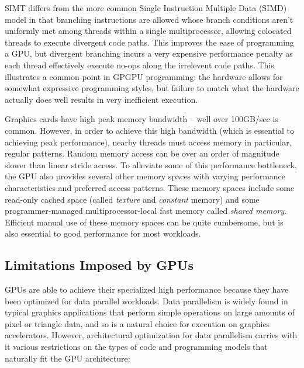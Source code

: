 \documentclass[preprint]{sigplanconf}
\begin{document}
SIMT differs from the more common Single Instruction Multiple Data (SIMD) model in that branching instructions are allowed whose branch conditions aren't uniformly met among threads within a single multiprocessor, allowing colocated threads to execute divergent code paths.  This improves the ease of programming a GPU, but divergent branching incurs a very expensive performance penalty as each thread effectively execute no-ops along the irrelevent code paths.  This illustrates a common point in GPGPU programming: the hardware allows for somewhat expressive programming styles, but failure to match what the hardware actually does well results in very inefficient execution.

Graphics cards have high peak memory bandwidth -- well over 100GB/sec is common.  However, in order to achieve this high bandwidth (which is essential to achieving peak performance), nearby threads must access memory in particular, regular patterns.  Random memory access can be over an order of magnitude slower than linear stride access.  To alleviate some of this performance bottleneck, the GPU also provides several other memory spaces with varying performance characteristics and preferred access patterns.  These memory spaces include some read-only cached space (called \emph{texture} and \emph{constant} memory) and some programmer-managed multiprocessor-local fast memory called \emph{shared memory}.  Efficient manual use of these memory spaces can be quite cumbersome, but is also essential to good performance for most workloads.

\subsection{Limitations Imposed by GPUs}
\label{GPULimitations}
GPUs are able to achieve their specialized high performance because they have been optimized for data parallel workloads. Data parallelism is widely found in typical graphics applications that perform simple operations on large amounts of pixel or triangle data, and so is a natural choice for execution on graphics accelerators.  However, architectural optimization for data parallelism carries with it various restrictions on the types of code and programming models that naturally fit the GPU architecture:
\end{document}
